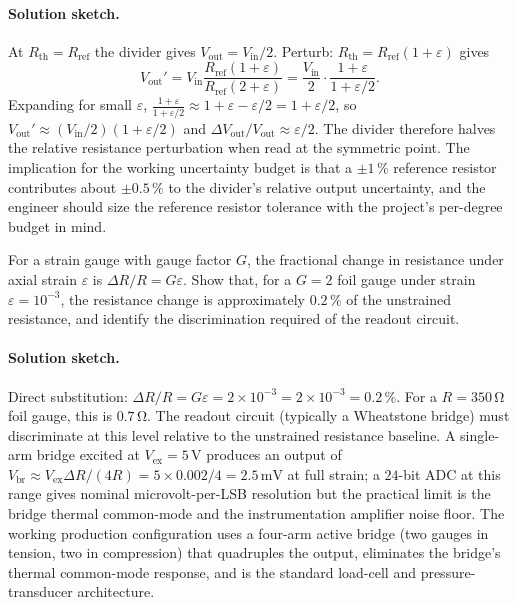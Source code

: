 \paragraph{Solution sketch.} At $R_{\text{th}} = R_{\text{ref}}$
the divider gives $V_{\text{out}} = V_{\text{in}}/2$. Perturb:
$R_{\text{th}} = R_{\text{ref}}(1 + \varepsilon)$ gives
\[
V_{\text{out}}' = V_{\text{in}} \frac{R_{\text{ref}}(1 + \varepsilon)}
                 {R_{\text{ref}}(2 + \varepsilon)}
              = \frac{V_{\text{in}}}{2} \cdot
                 \frac{1 + \varepsilon}{1 + \varepsilon/2}.
\]
Expanding for small $\varepsilon$,
$\tfrac{1 + \varepsilon}{1 + \varepsilon/2} \approx
1 + \varepsilon - \varepsilon/2 = 1 + \varepsilon/2$, so
$V_{\text{out}}' \approx (V_{\text{in}}/2)(1 + \varepsilon/2)$ and
$\Delta V_{\text{out}}/V_{\text{out}} \approx \varepsilon/2$. The
divider therefore halves the relative resistance perturbation when
read at the symmetric point. The implication for the working
uncertainty budget is that a $\pm 1\,\%$ reference resistor
contributes about $\pm 0.5\,\%$ to the divider's relative output
uncertainty, and the engineer should size the reference resistor
tolerance with the project's per-degree budget in mind.

\begin{exercise}
For a strain gauge with gauge factor $G$, the fractional change in
resistance under axial strain $\varepsilon$ is $\Delta R / R = G
\varepsilon$. Show that, for a $G = 2$ foil gauge under strain
$\varepsilon = 10^{-3}$, the resistance change is approximately
$0.2\,\%$ of the unstrained resistance, and identify the
discrimination required of the readout circuit.
\end{exercise}

\paragraph{Solution sketch.} Direct substitution:
$\Delta R / R = G \varepsilon = 2 \times 10^{-3} = 2 \times 10^{-3}
= 0.2\,\%$. For a $R = 350 \,\si{\ohm}$ foil gauge, this is
$0.7 \,\si{\ohm}$. The readout circuit (typically a Wheatstone
bridge) must discriminate at this level relative to the
unstrained resistance baseline. A single-arm bridge excited at
$V_{\text{ex}} = 5 \,\si{\volt}$ produces an output of
$V_{\text{br}} \approx V_{\text{ex}} \Delta R/(4 R) =
5 \times 0.002/4 = 2.5 \,\si{\milli\volt}$ at full strain; a
$24$-bit ADC at this range gives nominal microvolt-per-LSB
resolution but the practical limit is the bridge thermal
common-mode and the instrumentation amplifier noise floor. The
working production configuration uses a four-arm active bridge
(two gauges in tension, two in compression) that quadruples the
output, eliminates the bridge's thermal common-mode response, and
is the standard load-cell and pressure-transducer architecture.

